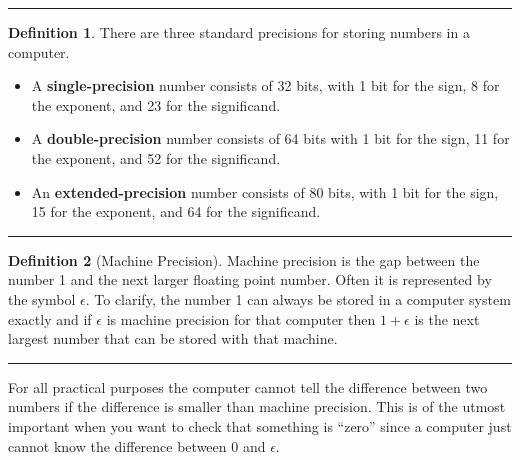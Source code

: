 \documentclass[
]{book}
\theoremstyle{definition}
\newtheorem{definition}{Definition}[chapter]
\theoremstyle{definition}
\theoremstyle{definition}
\theoremstyle{remark}
\begin{document}
\begin{center}\rule{0.5\linewidth}{0.5pt}\end{center}

\begin{definition}
\protect\hypertarget{def:unnamed-chunk-22}{}{\label{def:unnamed-chunk-22} }There are three standard precisions for storing numbers in a computer.

\begin{itemize}
\item
  A \textbf{single-precision} number consists of 32 bits, with 1 bit for
  the sign, 8 for the exponent, and 23 for the significand.
\item
  A \textbf{double-precision} number consists of 64 bits with 1 bit for the
  sign, 11 for the exponent, and 52 for the significand.
\item
  An \textbf{extended-precision} number consists of 80 bits, with 1 bit for
  the sign, 15 for the exponent, and 64 for the significand.
\end{itemize}
\end{definition}

\begin{center}\rule{0.5\linewidth}{0.5pt}\end{center}

\begin{definition}[Machine Precision]
\protect\hypertarget{def:unnamed-chunk-23}{}{\label{def:unnamed-chunk-23} {} }Machine precision is the gap between the number 1 and the next
larger floating point number. Often it is represented by the symbol
\(\epsilon\). To clarify, the number 1 can always be stored in a computer
system exactly and if \(\epsilon\) is machine precision for that computer
then \(1+\epsilon\) is the next largest number that can be stored with
that machine.
\end{definition}

\begin{center}\rule{0.5\linewidth}{0.5pt}\end{center}

For all practical purposes the computer cannot tell the difference
between two numbers if the difference is smaller than machine precision.
This is of the utmost important when you want to check that something is
``zero'' since a computer just cannot know the difference between \(0\) and
\(\epsilon\).
\end{document}
